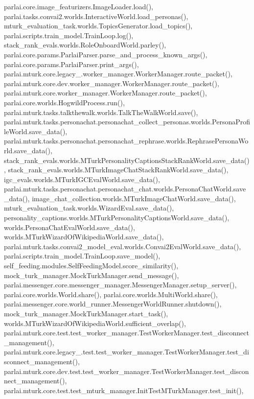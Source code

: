 parlai.\+core.\+image\+\_\+featurizers.\+Image\+Loader.\+load(), parlai.\+tasks.\+convai2.\+worlds.\+Interactive\+World.\+load\+\_\+personas(), mturk\+\_\+evaluation\+\_\+task.\+worlds.\+Topics\+Generator.\+load\+\_\+topics(), parlai.\+scripts.\+train\+\_\+model.\+Train\+Loop.\+log(), stack\+\_\+rank\+\_\+evals.\+worlds.\+Role\+Onboard\+World.\+parley(), parlai.\+core.\+params.\+Parlai\+Parser.\+parse\+\_\+and\+\_\+process\+\_\+known\+\_\+args(), parlai.\+core.\+params.\+Parlai\+Parser.\+print\+\_\+args(), parlai.\+mturk.\+core.\+legacy\+\_.\+worker\+\_\+manager.\+Worker\+Manager.\+route\+\_\+packet(), parlai.\+mturk.\+core.\+dev.\+worker\+\_\+manager.\+Worker\+Manager.\+route\+\_\+packet(), parlai.\+mturk.\+core.\+worker\+\_\+manager.\+Worker\+Manager.\+route\+\_\+packet(), parlai.\+core.\+worlds.\+Hogwild\+Process.\+run(), parlai.\+mturk.\+tasks.\+talkthewalk.\+worlds.\+Talk\+The\+Walk\+World.\+save(), parlai.\+mturk.\+tasks.\+personachat.\+personachat\+\_\+collect\+\_\+personas.\+worlds.\+Persona\+Profile\+World.\+save\+\_\+data(), parlai.\+mturk.\+tasks.\+personachat.\+personachat\+\_\+rephrase.\+worlds.\+Rephrase\+Persona\+World.\+save\+\_\+data(), stack\+\_\+rank\+\_\+evals.\+worlds.\+M\+Turk\+Personality\+Captions\+Stack\+Rank\+World.\+save\+\_\+data(), stack\+\_\+rank\+\_\+evals.\+worlds.\+M\+Turk\+Image\+Chat\+Stack\+Rank\+World.\+save\+\_\+data(), igc\+\_\+evals.\+worlds.\+M\+Turk\+I\+G\+C\+Eval\+World.\+save\+\_\+data(), parlai.\+mturk.\+tasks.\+personachat.\+personachat\+\_\+chat.\+worlds.\+Persona\+Chat\+World.\+save\+\_\+data(), image\+\_\+chat\+\_\+collection.\+worlds.\+M\+Turk\+Image\+Chat\+World.\+save\+\_\+data(), mturk\+\_\+evaluation\+\_\+task.\+worlds.\+Wizard\+Eval.\+save\+\_\+data(), personality\+\_\+captions.\+worlds.\+M\+Turk\+Personality\+Captions\+World.\+save\+\_\+data(), worlds.\+Persona\+Chat\+Eval\+World.\+save\+\_\+data(), worlds.\+M\+Turk\+Wizard\+Of\+Wikipedia\+World.\+save\+\_\+data(), parlai.\+mturk.\+tasks.\+convai2\+\_\+model\+\_\+eval.\+worlds.\+Convai2\+Eval\+World.\+save\+\_\+data(), parlai.\+scripts.\+train\+\_\+model.\+Train\+Loop.\+save\+\_\+model(), self\+\_\+feeding.\+modules.\+Self\+Feeding\+Model.\+score\+\_\+similarity(), mock\+\_\+turk\+\_\+manager.\+Mock\+Turk\+Manager.\+send\+\_\+message(), parlai.\+messenger.\+core.\+messenger\+\_\+manager.\+Messenger\+Manager.\+setup\+\_\+server(), parlai.\+core.\+worlds.\+World.\+share(), parlai.\+core.\+worlds.\+Multi\+World.\+share(), parlai.\+messenger.\+core.\+world\+\_\+runner.\+Messenger\+World\+Runner.\+shutdown(), mock\+\_\+turk\+\_\+manager.\+Mock\+Turk\+Manager.\+start\+\_\+task(), worlds.\+M\+Turk\+Wizard\+Of\+Wikipedia\+World.\+sufficient\+\_\+overlap(), parlai.\+mturk.\+core.\+test.\+test\+\_\+worker\+\_\+manager.\+Test\+Worker\+Manager.\+test\+\_\+disconnect\+\_\+management(), parlai.\+mturk.\+core.\+legacy\+\_.\+test.\+test\+\_\+worker\+\_\+manager.\+Test\+Worker\+Manager.\+test\+\_\+disconnect\+\_\+management(), parlai.\+mturk.\+core.\+dev.\+test.\+test\+\_\+worker\+\_\+manager.\+Test\+Worker\+Manager.\+test\+\_\+disconnect\+\_\+management(), parlai.\+mturk.\+core.\+test.\+test\+\_\+mturk\+\_\+manager.\+Init\+Test\+M\+Turk\+Manager.\+test\+\_\+init(), 
